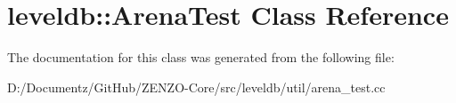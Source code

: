 \hypertarget{classleveldb_1_1_arena_test}{}\section{leveldb\+::Arena\+Test Class Reference}
\label{classleveldb_1_1_arena_test}


The documentation for this class was generated from the following file\+:\begin{DoxyCompactItemize}
\item 
D\+:/\+Documentz/\+Git\+Hub/\+Z\+E\+N\+Z\+O-\/\+Core/src/leveldb/util/arena\+\_\+test.\+cc\end{DoxyCompactItemize}
